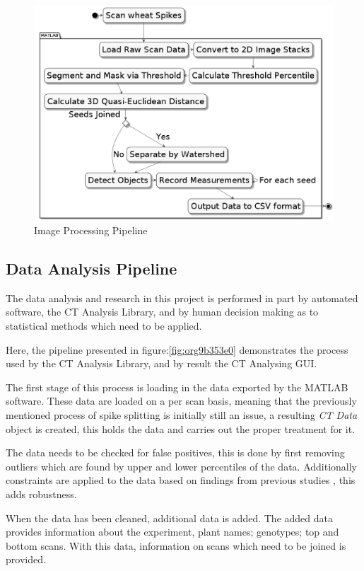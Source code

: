 \documentclass[11pt]{report}
\begin{document}
\begin{figure}[htbp]
\centering
\includegraphics[width=15cm]{./images/matlab.png}
\caption{\label{fig:orgc5f0f25}
Image Processing Pipeline}
\end{figure}

\subsection{Data Analysis Pipeline}
\label{sec:orga247afa}
The data analysis and research in this project is performed in part by automated software, the CT Analysis Library, and by human decision making as to statistical methods which need to be applied.

Here, the pipeline presented in figure:\ref{fig:org9b353e0} demonstrates the process used by the CT Analysis Library, and by result the CT Analysing GUI.

The first stage of this process is loading in the data exported by the MATLAB software. These data are loaded on a per scan basis, meaning that the previously mentioned process of spike splitting is initially still an issue, a resulting \emph{CT Data} object is created, this holds the data and carries out the proper treatment for it.

The data needs to be checked for false positives, this is done by first removing outliers which are found by upper and lower percentiles of the data. Additionally constraints are applied to the data based on findings from previous studies \cite{Hughes2017}, this adds robustness.

When the data has been cleaned, additional data is added. The added data provides information about the experiment, plant names; genotypes; top and bottom scans. With this data, information on scans which need to be joined is provided.
\end{document}
